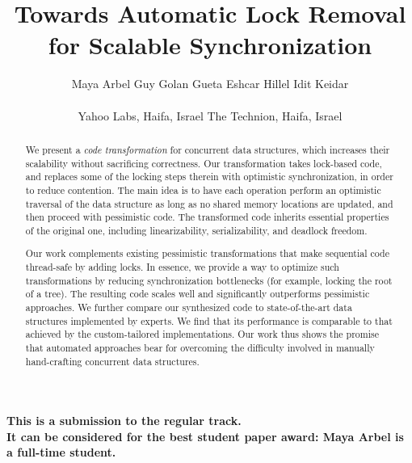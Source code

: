 \documentclass[11pt]{article}
\begin{document}
\begin{titlepage}

\title{Towards Automatic Lock Removal\\ for Scalable Synchronization}
\author{
Maya Arbel\footnotemark[1] \footnotemark[2] \hspace{0.3in} 
Guy Golan Gueta\footnotemark[1]  \hspace{0.3in}
Eshcar Hillel\footnotemark[1]  \hspace{0.3in}
Idit Keidar\footnotemark[1] \footnotemark[2]\\
\\
\large{
\footnotemark[1]Yahoo Labs, Haifa, Israel \hspace{0.3in} 
\footnotemark[2]The Technion, Haifa, Israel
}
}
\date{}

\maketitle

\begin{abstract}
We present a \emph{code transformation} for concurrent data structures,
which increases their scalability without sacrificing correctness.
Our transformation takes lock-based code, and replaces some of the
locking steps therein with optimistic synchronization, in order to reduce contention. The main idea is to
have each operation perform an optimistic traversal of the data structure
as long as no shared memory locations are updated, and then proceed with
pessimistic code. The transformed code inherits essential
properties of the original one, including linearizability, serializability,
and deadlock freedom.

Our work complements existing pessimistic transformations that make
sequential code thread-safe by adding locks.
In essence, we provide a way to optimize such transformations by reducing
synchronization bottlenecks (for example, locking the root of a tree).
The resulting code scales well and significantly outperforms
pessimistic approaches. We further compare our synthesized code to state-of-the-art
data structures implemented by experts.
We find that its performance is comparable %
to that achieved by the custom-tailored implementations.
Our work thus shows the promise that automated approaches
bear for overcoming the difficulty involved in manually
hand-crafting concurrent data structures.

\end{abstract}

\bigskip\bigskip
\noindent
{\bf
This is a submission to the regular track.\\
It can be considered for the best student paper award:
Maya Arbel is a full-time student.}

\thispagestyle{empty}
\end{titlepage}	
\end{document}
